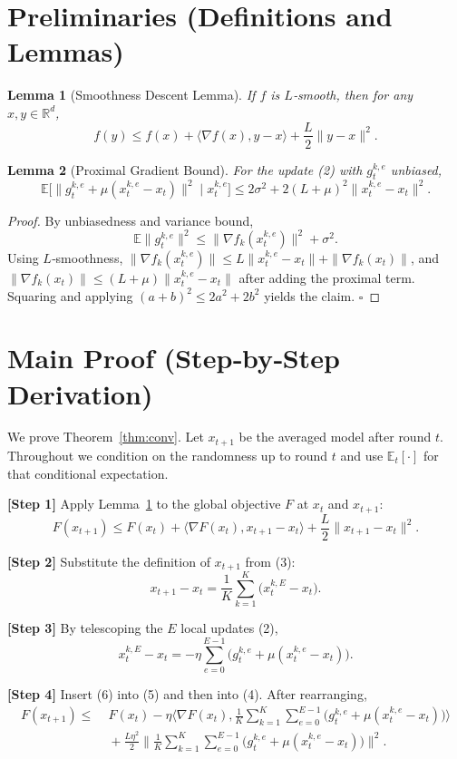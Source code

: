 \documentclass[11pt]{article}
\newtheorem{lemma}{Lemma}
\begin{document}
\newpage
\section*{Preliminaries (Definitions and Lemmas)}
\begin{lemma}[Smoothness Descent Lemma]\label{lem:smooth}
If $f$ is $L$‑smooth, then for any $x,y\in\mathbb{R}^d$,
\[
f(y)\le f(x)+\langle\nabla f(x),y-x\rangle+\frac{L}{2}\|y-x\|^2 .
\]
\end{lemma}
\begin{lemma}[Proximal Gradient Bound]\label{lem:prox}
For the update (2) with $g_{t}^{k,e}$ unbiased,
\[
\mathbb{E}\big[\|g_{t}^{k,e}+\mu (x_{t}^{k,e}-x_t)\|^2\mid x_{t}^{k,e}\big]
\le 2\sigma^2+2(L+\mu)^2\|x_{t}^{k,e}-x_t\|^2 .
\]
\end{lemma}
\begin{proof}
By unbiasedness and variance bound,
\[
\mathbb{E}\|g_{t}^{k,e}\|^2\le\|\nabla f_k(x_{t}^{k,e})\|^2+\sigma^2 .
\]
Using $L$‑smoothness,
$\|\nabla f_k(x_{t}^{k,e})\|\le L\|x_{t}^{k,e}-x_t\|+ \|\nabla f_k(x_t)\|$, and $\|\nabla f_k(x_t)\|\le (L+\mu)\|x_{t}^{k,e}-x_t\|$ after adding the proximal term. Squaring and applying $(a+b)^2\le2a^2+2b^2$ yields the claim. \hfill $\square$
\end{proof}

\section*{Main Proof (Step‑by‑Step Derivation)}
We prove Theorem~\ref{thm:conv}. Let $x_{t+1}$ be the averaged model after round $t$. Throughout we condition on the randomness up to round $t$ and use $\mathbb{E}_t[\cdot]$ for that conditional expectation.

\noindent\textbf{[Step 1]} Apply Lemma~\ref{lem:smooth} to the global objective $F$ at $x_t$ and $x_{t+1}$:
\[
F(x_{t+1})\le F(x_t)+\big\langle\nabla F(x_t),x_{t+1}-x_t\big\rangle+\frac{L}{2}\|x_{t+1}-x_t\|^2 .
\tag{4}
\]

\noindent\textbf{[Step 2]} Substitute the definition of $x_{t+1}$ from (3):
\[
x_{t+1}-x_t=\frac1K\sum_{k=1}^K\big(x_{t}^{k,E}-x_t\big).
\tag{5}
\]

\noindent\textbf{[Step 3]} By telescoping the $E$ local updates (2),
\[
x_{t}^{k,E}-x_t
= -\eta\sum_{e=0}^{E-1}\big(g_{t}^{k,e}+\mu (x_{t}^{k,e}-x_t)\big).
\tag{6}
\]

\noindent\textbf{[Step 4]} Insert (6) into (5) and then into (4). After rearranging,
\[
\begin{aligned}
F(x_{t+1})
\le &\;F(x_t)-\eta\Big\langle\nabla F(x_t),\frac1K\sum_{k=1}^K\sum_{e=0}^{E-1}\big(g_{t}^{k,e}+\mu (x_{t}^{k,e}-x_t)\big)\Big\rangle\\
&\;+\frac{L\eta^{2}}{2}\Big\|\frac1K\sum_{k=1}^K\sum_{e=0}^{E-1}\big(g_{t}^{k,e}+\mu (x_{t}^{k,e}-x_t)\big)\Big\|^{2}.
\end{aligned}
\tag{7}
\]
\end{document}
